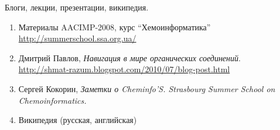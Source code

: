 \documentclass[12pt, a4paper]{article}
\begin{document}
\noindent Блоги, лекции, презентации, википедия.

\begin{enumerate}
  \item Материалы AACIMP-2008, курс ``Хемоинформатика'' \\ 
	 \url{http://summerschool.ssa.org.ua/}
  \item Дмитрий Павлов,
  	 \emph{Навигация в мире органических соединений}.\\
  	 \url{http://shmat-razum.blogspot.com/2010/07/blog-post.html}
  \item Сергей Кокорин, \emph{Заметки о Cheminfo'S. Strasbourg Summer School on Chemoinformatics.} 
  \item Википедия (русская, английская)
\end{enumerate}
\end{document}

